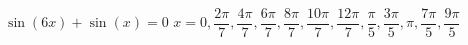 { $\sin(6x) + \sin(x) = 0$}
{ $x = 0, \dfrac{2\pi}{7}, \dfrac{4\pi}{7}, \dfrac{6\pi}{7}, \dfrac{8\pi}{7}, \dfrac{10\pi}{7}, \dfrac{12\pi}{7}, \dfrac{\pi}{5}, \dfrac{3\pi}{5}, \pi, \dfrac{7\pi}{5}, \dfrac{9\pi}{5}$ }
